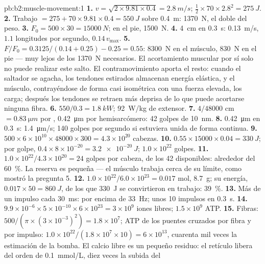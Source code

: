 \begin{solution}{pb:b2:muscle-movement:1}
\textbf{1.} $v = \sqrt{2\times 9.81\times 0.4} = \qty{2.8}{m/s}$;
$\tfrac12\times 70\times 2.8^{2} = \qty{275}{J}$.
\textbf{2.} Trabajo $= 275 + 70\times 9.81\times 0.4 = \qty{550}{J}$ sobre
\qty{0.4}{m}: \qty{1370}{N}, el doble del peso.
\textbf{3.} $F_0 = 500\times 30 = \qty{15000}{N}$; en el pie,
\qty{1500}{N}.
\textbf{4.} \qty{4}{cm} en \qty{0.3}{s}: \qty{0.13}{m/s}, $1.1$ longitudes
por segundo, $0.14\,v_{\max}$.
\textbf{5.} $F/F_0 = 0.3125/(0.14 + 0.25) - 0.25 = 0.55$: \qty{8300}{N}
en el músculo, \qty{830}{N} en el pie --- muy lejos de los
\qty{1370}{N} necesarios. El acortamiento muscular por sí solo no puede
realizar este salto. El contramovimiento aporta el resto: cuando el
saltador se agacha, los tendones estirados almacenan energía elástica, y el
músculo, contrayéndose de forma casi isométrica con una fuerza elevada, los
carga; después los tendones se retraen más deprisa de lo que puede
acortarse ninguna fibra.
\textbf{6.} $550/0.3 = \qty{1.8}{kW}$; \qty{92}{W/kg} de extensor.
\textbf{7.} $4/\num{48000}$ cm $= \qty{0.83}{\micro m}$ por ,
\qty{0.42}{\micro m} por hemisarcómero: 42 golpes de \qty{10}{nm}.
\textbf{8.} \qty{0.42}{\micro m} en \qty{0.3}{s}: \qty{1.4}{\micro m/s};
140 golpes por segundo si estuviera unida de forma continua.
\textbf{9.} $500\times 6\times 10^{10}\times \num{48000}\times 300 =
4.3\times 10^{20}$ cabezas.
\textbf{10.} $0.55\times \num{15000}\times 0.04 = \qty{330}{J}$; por
golpe, $0.4\times 8\times 10^{-20} = \qty{3.2e-20}{J}$; $1.0\times
10^{22}$ golpes.
\textbf{11.} $1.0\times 10^{22}/4.3\times 10^{20} = 24$ golpes por
cabeza, de los 42 disponibles: alrededor del \qty{60}{\%}. La reserva es
pequeña --- el músculo trabaja cerca de su límite, como mostró la
pregunta 5.
\textbf{12.} $1.0\times 10^{22}/6.0\times 10^{23} = 0.017$ mol,
\qty{8.7}{g}; su energía, $0.017\times 50 = \qty{860}{J}$, de los que
\qty{330}{J} se convirtieron en trabajo: \qty{39}{\%}.
\textbf{13.} Más de un impulso cada \qty{30}{ms}: por encima de
\qty{33}{Hz}; unos 10 impulsos en \qty{0.3}{s}.
\textbf{14.} $9.9\times 10^{-6}\times 5\times 10^{-10}\times 6\times
10^{23} = 3\times 10^{9}$ iones libres; $1.5\times 10^{9}$ ATP.
\textbf{15.} Fibras: $500/(\pi\times(3\times 10^{-3})^{2}) = 1.8\times
10^{7}$; ATP de los puentes cruzados por fibra y por impulso: $1.0\times
10^{22}/(1.8\times 10^{7}\times 10) = 6\times 10^{13}$, cuarenta mil veces
la estimación de la bomba. El calcio libre es un pequeño residuo: el
retículo libera del orden de \qty{0.1}{mmol/L}, diez veces la subida del

\end{solution}
